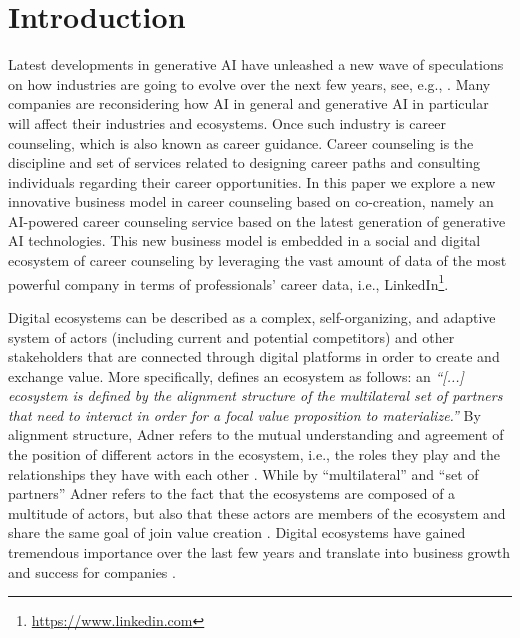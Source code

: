 \section{Introduction}
\label{sec:introduction}

Latest developments in generative AI have unleashed a new wave of speculations on how industries are going to
evolve over the next few years, see, e.g., \cite{chuiHowGenerativeAI2022}. Many companies are reconsidering how
AI in general and generative AI in particular will affect their industries and ecosystems. Once such industry is
career counseling, which is also known as career guidance. Career counseling is the discipline and set of services
related to designing career paths and consulting individuals regarding their career opportunities.
In this paper we explore a new innovative business model in career counseling based on co-creation, namely an AI-powered
career counseling service based on the latest generation of generative AI technologies. This new business model is
embedded in a social and digital ecosystem of career counseling by leveraging the vast amount of data of the most powerful
company in terms of professionals' career data, i.e., LinkedIn\footnote[1]{\url{https://www.linkedin.com}}.

Digital ecosystems can be described as a complex, self-organizing, and adaptive system of actors (including current and
potential competitors) and other stakeholders that are connected through digital platforms in order to create and exchange
value. More specifically, \cite{adnerEcosystemStructureActionable2017} defines an ecosystem as follows: an \textit{``[...]
ecosystem is defined by the alignment structure of the multilateral set of partners that need to interact in order for a
focal value proposition to materialize.''} By alignment structure, Adner refers to the mutual understanding and agreement
of the position of different actors in the ecosystem, i.e., the roles they play and the relationships they have with each other
\citep[p. 42]{adnerEcosystemStructureActionable2017}. While by ``multilateral'' and ``set of partners'' Adner refers to
the fact that the ecosystems are composed of a multitude of actors, but also that these actors are members of the ecosystem
and share the same goal of join value creation \citep[p. 42-43]{adnerEcosystemStructureActionable2017}. Digital ecosystems
have gained tremendous importance over the last few years and translate into business growth and success for companies
\citep{weillThrivingIncreasinglyDigital2015}.

